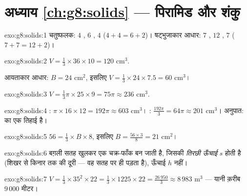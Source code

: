 \section*{अध्याय \ref{ch:g8:solids} --- पिरामिड और शंकु}

\begin{solution}{exo:g8:solids:1}
चतुष्फलक: $4$ , $6$ , $4$ 
($4 + 4 = 6 + 2$)। षट्भुजाकार आधार: $7$ , $12$ , $7$
 ($7 + 7 = 12 + 2$)।
\end{solution}

\begin{solution}{exo:g8:solids:2}
$V = \frac13 \times 36 \times 10 = 120$ cm$^3$.

आयताकार आधार: $B = 24$ cm$^2$, इसलिए
$V = \frac13 \times 24 \times 7.5 = 60$ cm$^3$।
\end{solution}

\begin{solution}{exo:g8:solids:3}
$V = \frac13 \pi \times 25 \times 9 = 75\pi \approx 236$ cm$^3$.
\end{solution}

\begin{solution}{exo:g8:solids:4}
: $\pi \times 16 \times 12 = 192\pi \approx 603$ cm$^3$।
: $\frac{192\pi}{3} = 64\pi \approx 201$ cm$^3$। अनुपात: 
 का एक तिहाई है।
\end{solution}

\begin{solution}{exo:g8:solids:5}
$56 = \frac13 \times B \times 8$, इसलिए
$B = \frac{56 \times 3}{8} = 21$ cm$^2$।
\end{solution}

\begin{solution}{exo:g8:solids:6}
बग़ली सतह खुलकर एक चक्र-फाँक बन जाती है, जिसकी  \emph{तिरछी
ऊँचाई} $s$ होती है (शिखर से किनार तक की दूरी --- वह  सतह पर
ही पड़ता है), ऊँचाई $h$ नहीं।
\end{solution}

\begin{solution}{exo:g8:solids:7}
$V = \frac13 \times 35^2 \times 22 = \frac13 \times 1225 \times 22
= \frac{26\,950}{3} \approx 8\,983$ m$^3$ --- यानी क़रीब $9\,000$
 मीटर।
\end{solution}

